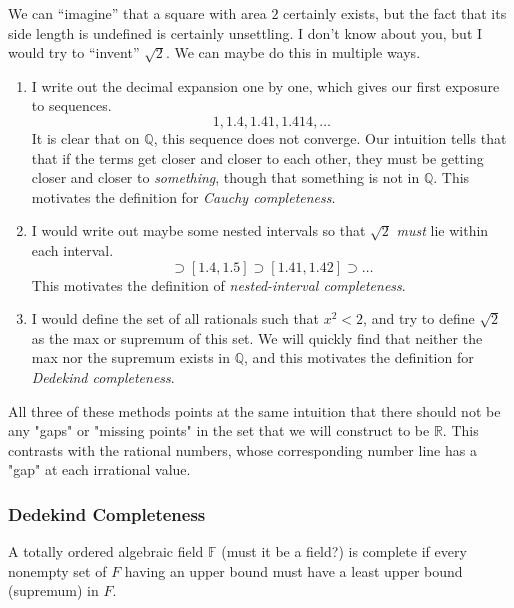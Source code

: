 \documentclass{article}
\begin{document}
      We can ``imagine'' that a square with area $2$ certainly exists, but the fact that its side length is undefined is certainly unsettling. I don't know about you, but I would try to ``invent'' $\sqrt{2}$. We can maybe do this in multiple ways. 
      \begin{enumerate}
        \item I write out the decimal expansion one by one, which gives our first exposure to sequences. 
        \begin{equation}
          1, 1.4, 1.41, 1.414, \ldots
        \end{equation} 
        It is clear that on $\mathbb{Q}$, this sequence does not converge. Our intuition tells that that if the terms get closer and closer to each other, they must be getting closer and closer to \textit{something}, though that something is not in $\mathbb{Q}$. This motivates the definition for \textit{Cauchy completeness}. 

        \item I would write out maybe some nested intervals so that $\sqrt{2}$ \textit{must}  lie within each interval. 
        \begin{equation}
          [1, 2] \supset [1.4, 1.5] \supset [1.41, 1.42] \supset \ldots 
        \end{equation}
        This motivates the definition of \textit{nested-interval completeness}. 

        \item I would define the set of all rationals such that $x^2 < 2$, and try to define $\sqrt{2}$ as the max or supremum of this set. We will quickly find that neither the max nor the supremum exists in $\mathbb{Q}$, and this motivates the definition for \textit{Dedekind completeness}. 
      \end{enumerate}

      All three of these methods points at the same intuition that there should not be any "gaps" or "missing points" in the set that we will construct to be $\mathbb{R}$. This contrasts with the rational numbers, whose corresponding number line has a "gap" at each irrational value. 

    \subsubsection{Dedekind Completeness} 

      \begin{definition}
        A totally ordered algebraic field $\mathbb{F}$ (must it be a field?) is complete if every nonempty set of $F$ having an upper bound must have a least upper bound (supremum) in $F$. 
      \end{definition}
\end{document}
